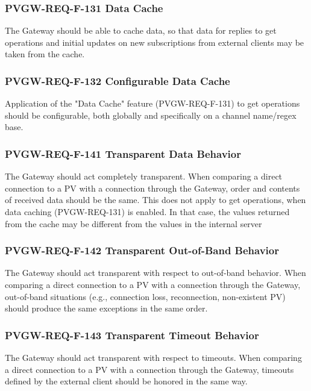 \documentclass[11pt
  , a4paper
  , article
  , oneside
]{memoir}
\begin{document}
\subsubsection{PVGW-REQ-F-131 Data Cache}
The Gateway should be able to cache data, so that data for replies to get operations and initial updates on new subscriptions from external clients may be taken from the cache.

\subsubsection{PVGW-REQ-F-132 Configurable Data Cache}
Application of the "Data Cache" feature (PVGW-REQ-F-131) to get operations should be configurable, both globally and specifically on a channel name/regex base.

\subsubsection{PVGW-REQ-F-141 Transparent Data Behavior}
The Gateway should act completely transparent. When comparing a direct connection to a PV with a connection through the Gateway, order and contents of received data should be the same.
This does not apply to get operations, when data caching (PVGW-REQ-131) is enabled. In that case, the values returned from the cache may be different from the values in the internal server

\subsubsection{PVGW-REQ-F-142 Transparent Out-of-Band Behavior}
The Gateway should act transparent with respect to out-of-band behavior. When comparing a direct connection to a PV with a connection through the Gateway, out-of-band situations (e.g., connection loss, reconnection, non-existent PV) should produce the same exceptions in the same order.

\subsubsection{PVGW-REQ-F-143 Transparent Timeout Behavior}
The Gateway should act transparent with respect to timeouts. When comparing a direct connection to a PV with a connection through the Gateway, timeouts defined by the external client should be honored in the same way.
\end{document}

